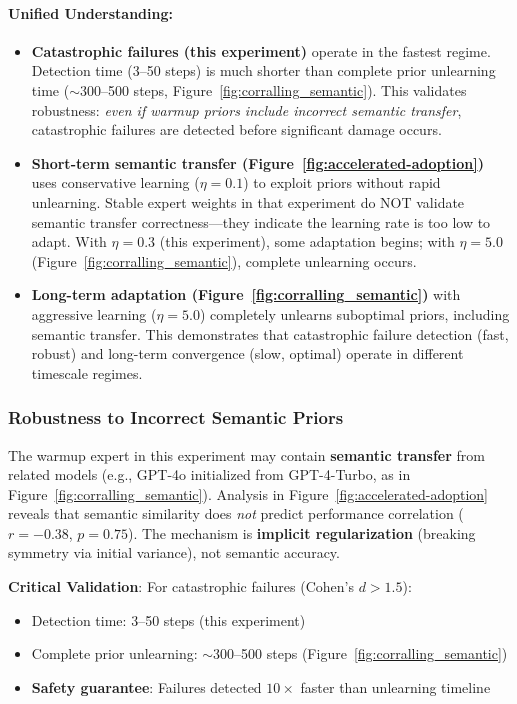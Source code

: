 \paragraph{Unified Understanding:}
\begin{itemize}
    \item \textbf{Catastrophic failures (this experiment)} operate in the fastest regime. Detection time (3--50 steps) is much shorter than complete prior unlearning time ($\sim$300--500 steps, Figure~\ref{fig:corralling_semantic}). This validates robustness: \emph{even if warmup priors include incorrect semantic transfer}, catastrophic failures are detected before significant damage occurs.
    
    \item \textbf{Short-term semantic transfer (Figure~\ref{fig:accelerated-adoption})} uses conservative learning ($\eta=0.1$) to exploit priors without rapid unlearning. Stable expert weights in that experiment do NOT validate semantic transfer correctness—they indicate the learning rate is too low to adapt. With $\eta=0.3$ (this experiment), some adaptation begins; with $\eta=5.0$ (Figure~\ref{fig:corralling_semantic}), complete unlearning occurs.
    
    \item \textbf{Long-term adaptation (Figure~\ref{fig:corralling_semantic})} with aggressive learning ($\eta=5.0$) completely unlearns suboptimal priors, including semantic transfer. This demonstrates that catastrophic failure detection (fast, robust) and long-term convergence (slow, optimal) operate in different timescale regimes.
\end{itemize}

\subsubsection{Robustness to Incorrect Semantic Priors}

The warmup expert in this experiment may contain \textbf{semantic transfer} from related models (e.g., GPT-4o initialized from GPT-4-Turbo, as in Figure~\ref{fig:corralling_semantic}). Analysis in Figure~\ref{fig:accelerated-adoption} reveals that semantic similarity does \emph{not} predict performance correlation ($r=-0.38$, $p=0.75$). The mechanism is \textbf{implicit regularization} (breaking symmetry via initial variance), not semantic accuracy.

\textbf{Critical Validation}: For catastrophic failures (Cohen's $d > 1.5$):
\begin{itemize}
    \item Detection time: 3--50 steps (this experiment)
    \item Complete prior unlearning: $\sim$300--500 steps (Figure~\ref{fig:corralling_semantic})
    \item \textbf{Safety guarantee}: Failures detected $10\times$ faster than unlearning timeline
\end{itemize}

